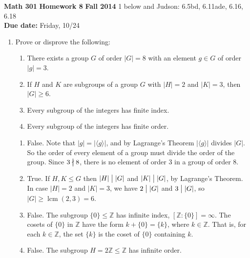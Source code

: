 \documentclass[12pt,reqno]{amsart}
\makeatletter
\newcommand{\Z}{\ensuremath{\mathbb{Z}}}
\newcommand{\lcm}{\operatorname{lcm}}
\def\localbig#1#2{%
  \sbox\z@{$#1
    \sbox\tw@{$#1()$}%
    \dimen@=\ht\tw@\advance\dimen@\dp\tw@
    \nulldelimiterspace\z@\left#2\vcenter to1.2\dimen@{}\right.
  $}\box\z@}
\newcommand{\divides}{\mathrel{\mathpalette\dividesaux\relax}}
\newcommand{\ndivides}{\mathrel{\mathpalette\ndividesaux\relax}}
\newcommand{\dividesaux}[2]{\mbox{$#1\localbig{#1}|$}}
\newcommand{\ndividesaux}[2]{%
  \mkern.5mu\ooalign{\hidewidth$#1\localbig{#1}|$\hidewidth\cr$#1\nmid$\cr}}
\newcommand{\<}{\ensuremath{\langle}}
\renewcommand{\>}{\ensuremath{\rangle}}
\newcommand{\probskip}{\vskip1cm}
\makeatother
\begin{document}
\thispagestyle{empty}

\noindent \textbf{Math 301} \hskip5cm {\bf Homework 8} \hfill {\bf Fall 2014}
\vskip1cm
 1 below and Judson: 6.5bd, 6.11ade, 6.16, 6.18\\
{\bf Due date:} Friday, 10/24

\bigskip


\begin{enumerate}[{\bf 1.}]

\item
Prove or disprove the following: 
\begin{enumerate}
\item 
There exists a group $G$ of order $|G| = 8$ with an element
$g \in G$ of order $|g|=3$.

\item
If $H$ and $K$ are subgroups of a group $G$ with $|H|=2$ and $|K|=3$, 
  then $|G|\geq 6$.

\item
Every subgroup of the integers has finite index.

\item 
Every subgroup of the integers has finite order.
\end{enumerate}

\medskip

\begin{enumerate}
\item False.  Note that $|g| = |\<g\>|$, and by Lagrange's Theorem $|\<g\>|$
  divides $|G|$.  So the order of every element of a group must divide the
  order of the group. Since $3 \ndivides 8$, there is no element of order 3 in a
  group of order 8.
\medskip
\item True.  If $H, K \leq G$ then $|H| \divides |G|$ and
$|K| \divides |G|$, by Lagrange's Theorem. 
In case $|H| = 2$ and $|K| = 3$, we have
$2\divides |G|$ and $3\divides |G|$, 
so $|G| \geq \lcm(2,3) = 6$.
\medskip
\item
False. The subgroup $ \{0\} \leq \Z$ has infinite index, 
$[\Z : \{0\}] = \infty$. The cosets of $\{0\}$ in $\Z$ have the form
$k+\{0\} = \{k\}$, where $k\in \Z$.  That is,  for each $k\in \Z$, the set $\{k\}$ is the coset
of $\{0\}$ containing $k$.
\medskip
\item
False. The subgroup $H = 2\Z \leq \Z$ has infinite order.
\end{enumerate}
\probskip


\end{enumerate}
\end{document}

